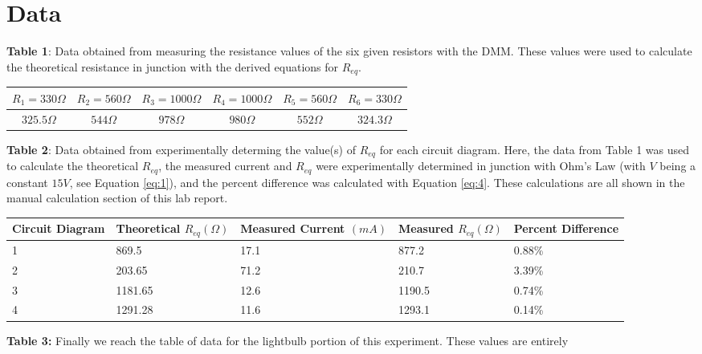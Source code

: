 \documentclass{article}
\theoremstyle{definition}
\begin{document}
\section{Data}
\textbf{Table 1}: Data obtained from measuring the resistance values of the six given resistors with the DMM.
These values were used to calculate the theoretical resistance in junction with the derived equations for $R_{eq}$.
\renewcommand{\arraystretch}{1.5}
\renewcommand{\tabcolsep}{0.2cm}
\begin{center}
    \begin{tabular}{|c|c|c|c|c|c|}
        \hline
        $R_1 = 330\Omega$ & $R_2 = 560\Omega$ & $R_3 = 1000\Omega$ & $R_4 = 1000\Omega$ & $R_5 = 560\Omega$ & $R_6 = 330\Omega$\\ 
        \hline
        $325.5\Omega$ & $544\Omega$ & $978\Omega$ & $980\Omega$ & $552\Omega$ & $324.3\Omega$ \\
        \hline
    \end{tabular}
\end{center}
\vspace{2cm}
\textbf{Table 2}: Data obtained from experimentally determing the value(s) of $R_{eq}$ for each circuit diagram.
Here, the data from Table 1 was used to calculate the theoretical $R_{eq}$, the measured current and $R_{eq}$ were experimentally determined
in junction with Ohm's Law (with $V$ being a constant $15V$, see Equation \ref{eq:1}), and the percent difference was calculated with
Equation \ref{eq:4}. These calculations are all shown in the manual calculation section of this lab report.
\begin{center}
    \begin{tabular}{|m{2cm}|m{2cm}|m{2cm}|m{2cm}|m{2cm}|}
        \hline
        Circuit \qquad Diagram & Theoretical $R_{eq} (\Omega)$ & Measured Current $(mA)$ & Measured $R_{eq} (\Omega) $ & Percent \quad Difference\\ 
        \hline
        1 & 869.5 & 17.1 & 877.2 & 0.88\%\\ 
        \hline
        2 & 203.65 & 71.2 & 210.7 & 3.39\%\\ 
        \hline
        3 & 1181.65 & 12.6 & 1190.5 & 0.74\%\\ 
        \hline
        4 & 1291.28 & 11.6 & 1293.1 & 0.14\%\\ 
        \hline
    \end{tabular}
\end{center}
\vspace{0.2cm}
\textbf{Table 3:} Finally we reach the table of data for the lightbulb portion of this experiment. These values are entirely
\end{document}
